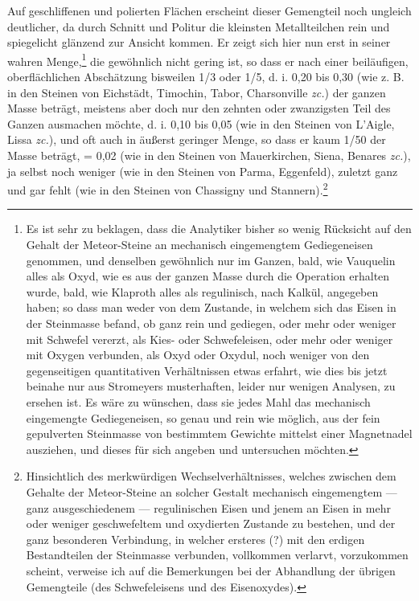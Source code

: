 \documentclass[a4paper, 11pt, oneside, german]{article}
\begin{document}
Auf geschliffenen und polierten Flächen erscheint dieser Gemengteil noch ungleich deutlicher, da durch Schnitt und Politur die kleinsten Metallteilchen rein und spiegelicht glänzend zur Ansicht kommen. Er zeigt sich hier nun erst in seiner wahren Menge,\footnote{Es ist sehr zu beklagen, dass die Analytiker bisher so wenig Rücksicht auf den Gehalt der Meteor-Steine an mechanisch eingemengtem Gediegeneisen genommen, und denselben gewöhnlich nur im Ganzen, bald, wie Vauquelin alles als Oxyd, wie es aus der ganzen Masse durch die Operation erhalten wurde, bald, wie Klaproth alles als regulinisch, nach Kalkül, angegeben haben; so dass man weder von dem Zustande, in welchem sich das Eisen in der Steinmasse befand, ob ganz rein und gediegen, oder mehr oder weniger mit Schwefel vererzt, als Kies- oder Schwefeleisen, oder mehr oder weniger mit Oxygen verbunden, als Oxyd oder Oxydul, noch weniger von den gegenseitigen quantitativen Verhältnissen etwas erfahrt, wie dies bis jetzt beinahe nur aus Stromeyers musterhaften, leider nur wenigen Analysen, zu ersehen ist. Es wäre zu wünschen, dass sie jedes Mahl das mechanisch eingemengte Gediegeneisen, so genau und rein wie möglich, aus der fein gepulverten Steinmasse von bestimmtem Gewichte mittelst einer Magnetnadel ausziehen, und dieses für sich angeben und untersuchen möchten.} die gewöhnlich nicht gering ist, so dass er nach einer beiläufigen, oberflächlichen Abschätzung bisweilen 1/3 oder 1/5, d. i. 0,20 bis 0,30 (wie z. B. in den Steinen von Eichstädt, Timochin, Tabor, Charsonville \emph{zc.}) der ganzen Masse beträgt, meistens aber doch nur den zehnten oder zwanzigsten Teil des Ganzen ausmachen möchte, d. i. 0,10 bis 0,05 (wie in den Steinen von L'Aigle, Lissa \emph{zc.}), und oft auch in äußerst geringer Menge, so dass er kaum 1/50 der Masse beträgt, = 0,02 (wie in den Steinen von Mauerkirchen, Siena, Benares \emph{zc.}), ja selbst noch weniger (wie in den Steinen von Parma, Eggenfeld), zuletzt ganz und gar fehlt (wie in den Steinen von Chassigny und Stannern).\footnote{Hinsichtlich des merkwürdigen Wechselverhältnisses, welches zwischen dem Gehalte der Meteor-Steine an solcher Gestalt mechanisch eingemengtem --- ganz ausgeschiedenem --- regulinischen Eisen und jenem an Eisen in mehr oder weniger geschwefeltem und oxydierten Zustande zu bestehen, und der ganz besonderen Verbindung, in welcher ersteres (?) mit den erdigen Bestandteilen der Steinmasse verbunden, vollkommen verlarvt, vorzukommen scheint, verweise ich auf die Bemerkungen bei der Abhandlung der übrigen Gemengteile (des Schwefeleisens und des Eisenoxydes).}
\end{document}
